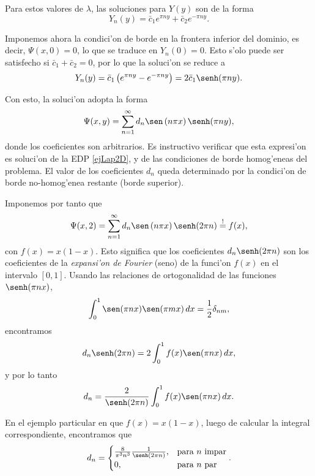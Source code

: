 Para estos valores de $\lambda$, las soluciones para $Y(y)$ son de la forma
\begin{equation}
Y_n(y) = \bar{c}_1e^{\pi ny} + \bar{c}_2e^{-\pi ny}.
\end{equation}

Imponemos ahora la condici'on de borde en la frontera inferior del dominio, es decir, $\Psi(x,0) = 0$, lo que se traduce en $Y_n(0)=0$. Esto s'olo puede ser satisfecho si $\bar{c}_1+\bar{c}_2=0$, por lo que la soluci'on se reduce a
\begin{equation}
Y_n(y) = \bar{c}_1\left(e^{\pi ny} -e^{-\pi ny}\right) = 2\bar{c}_1 \senh(\pi ny).
\end{equation}

Con esto, la soluci'on adopta la forma
\begin{equation}\label{ejLap2D2}
\Psi(x,y) = \sum_{n=1}^\infty d_n \sen\left(n\pi x\right)\senh(\pi ny),
\end{equation}
donde los coeficientes son arbitrarios. Es instructivo verificar que esta expresi'on es soluci'on de la EDP \eqref{ejLap2D}, y de las condiciones de borde homog'eneas del problema. El valor de los coeficientes $d_n$ queda determinado por la condici'on de borde no-homog'enea restante (borde superior).

Imponemos por tanto que
\begin{equation}
\Psi(x,2) = \sum_{n=1}^\infty d_n \sen\left(n\pi x\right)\senh(2\pi n) \stackrel{!}{=} f(x),
\end{equation}
con $f(x)=x(1-x)$. Esto significa que los coeficientes $d_n\senh(2\pi n)$ son los coeficientes de la \textit{expansi'on de Fourier} (seno) de la funci'on $f(x)$ en el intervalo $[0,1]$. Usando las relaciones de ortogonalidad de las funciones $\senh(\pi nx)$, 
\begin{equation}
\int_0^1 \sen(\pi nx)\sen(\pi mx)\,dx = \frac{1}{2}\delta_{nm},
\end{equation}
encontramos
\begin{equation}
d_n\senh(2\pi n) = 2 \int_0^1 f(x)\sen(\pi nx)\,dx,
\end{equation}
y por lo tanto
\begin{equation}
d_n = \frac{2}{\senh(2\pi n)} \int_0^1 f(x)\sen(\pi nx)\,dx.
\end{equation}

En el ejemplo particular en que $f(x)=x(1-x)$, luego de calcular la integral correspondiente, encontramos que
\begin{equation}
d_n = \begin{cases}
	\frac{8}{\pi^3n^3}\frac{1}{\senh(2\pi n)} , & \text{para } n \text{ impar} \\
	0 , & \text{para } n \text{ par} \end{cases}.
\end{equation}

